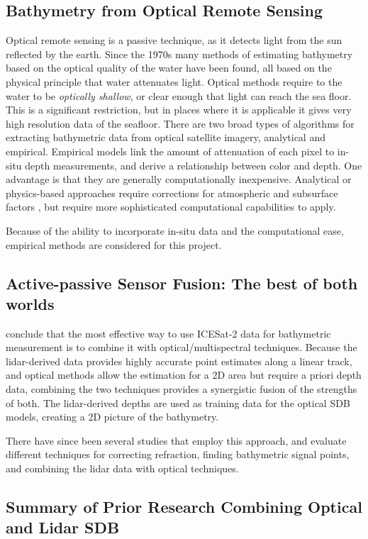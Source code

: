\subsection{Bathymetry from Optical Remote Sensing}
Optical remote sensing is a passive technique, as it detects light from the sun reflected by the earth. Since the 1970s many methods of estimating bathymetry based on the optical quality of the water have been found, all based on the physical principle that water attenuates light. Optical methods require to the water to be \emph{optically shallow}, or clear enough that light can reach the sea floor. This is a significant restriction, but in places where it is applicable it gives very high resolution data of the seafloor. There are two broad types of algorithms for extracting bathymetric data from optical satellite imagery, analytical and empirical. Empirical models link the amount of attenuation of each pixel to in-situ depth measurements, and derive a relationship between color and depth. One advantage is that they are generally computationally inexpensive. Analytical or physics-based approaches require corrections for atmospheric and subsurface factors \parencite{Turner2021}, but require more sophisticated computational capabilities to apply.

Because of the ability to incorporate in-situ data and the computational ease, empirical methods are considered for this project.

\subsection{Active-passive Sensor Fusion: The best of both worlds}
\cite{Parrish2019} conclude that the most effective way to use ICESat-2 data for bathymetric measurement is to combine it with optical/multispectral techniques. Because the lidar-derived data provides highly accurate point estimates along a linear track, and optical methods allow the estimation for a 2D area but require a priori depth data, combining the two techniques provides a synergistic fusion of the strengths of both. The lidar-derived depths are used as training data for the optical SDB models, creating a 2D picture of the bathymetry.

There have since been several studies that employ this approach, and evaluate different techniques for correcting refraction, finding bathymetric signal points, and combining the lidar data with optical techniques.

\subsection{Summary of Prior Research Combining Optical and Lidar SDB}

